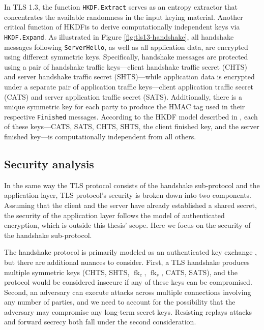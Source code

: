 \documentclass[letterpaper,12pt,titlepage,oneside,final]{book}
\begin{document}
In TLS 1.3, the function \texttt{HKDF.Extract} serves as an entropy extractor that concentrates the available randomness in the input keying material. 
Another critical function of HKDFis to derive computationally independent keys via \texttt{HKDF.Expand}.
As illustrated in Figure \ref{fig:tls13-handshake}, all handshake messages following \texttt{ServerHello}, as well as all application data, are encrypted using different symmetric keys.
Specifically, handshake messages are protected using a pair of handshake traffic keys—client handshake traffic secret (CHTS) and server handshake traffic secret (SHTS)—while application data is encrypted under a separate pair of application traffic keys—client application traffic secret (CATS) and server application traffic secret (SATS).
Additionally, there is a unique symmetric key for each party to produce the HMAC tag used in their respective \texttt{Finished} messages.
According to the HKDF model described in \cite{DBLP:conf/eurosp/KrawczykW16,DBLP:conf/crypto/Krawczyk10}, each of these keys—CATS, SATS, CHTS, SHTS, the client finished key, and the server finished key—is computationally independent from all others.

\subsection{Security analysis}\label{sec:tls13-security-analysis}
In the same way the TLS protocol consists of the handshake sub-protocol and the application layer, TLS protocol's security is broken down into two components.
Assuming that the client and the server have already established a shared secret, the security of the application layer follows the model of authenticated encryption, which is outside this thesis' scope.
Here we focus on the security of the handshake sub-protocol.

The handshake protocol is primarily modeled as an authenticated key exchange \cite{DBLP:conf/crypto/BellareR93}, but there are additional nuances to consider.
First, a TLS handshake produces multiple symmetric keys (CHTS, SHTS, $\operatorname{fk}_c$, $\operatorname{fk}_s$, CATS, SATS), and the protocol would be considered insecure if any of these keys can be compromised.
Second, an adversary can execute attacks across multiple connections involving any number of parties, and we need to account for the possibility that the adversary may compromise any long-term secret keys.
Resisting replays attacks and forward secrecy both fall under the second consideration.
\end{document}
